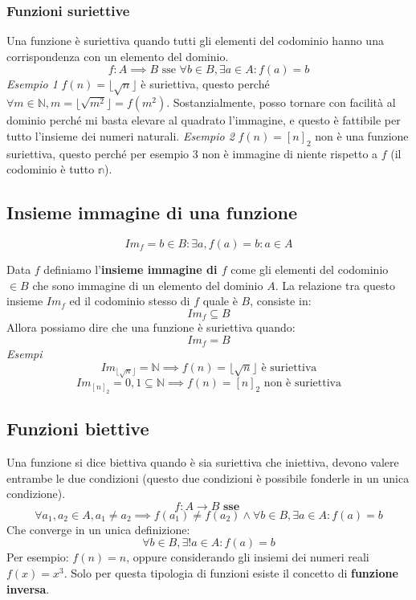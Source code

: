 \documentclass{article}
\begin{document}
\subsubsection{Funzioni suriettive}
Una funzione è suriettiva quando tutti gli elementi del codominio hanno una corrispondenza con un elemento del dominio.
$$f:A\implies B\text{ sse } \forall b\in B, \exists a \in A : f(a)=b$$
\noindent
\textit{Esempio 1}
\newline
$f(n)=\lfloor\sqrt{n}\rfloor$ è suriettiva, questo perché $\forall m\in \mathbb{N}, m=\lfloor\sqrt{m^2}\rfloor=f(m^2)$. Sostanzialmente, posso tornare con facilità al dominio perché mi basta elevare al quadrato l'immagine, e questo è fattibile per tutto l'insieme dei numeri naturali.
\noindent
\newline
\linebreak
\textit{Esempio 2}
\newline
$f(n)=[n]_2$ non è una funzione suriettiva, questo perché per esempio $3$ non è immagine di niente rispetto a $f$ (il codominio è tutto $\mathbb{n}$).

\subsection{Insieme immagine di una funzione}
$$Im_f={b\in B:\exists a,f(a)=b}:a\in A$$

Data $f$ definiamo l'\textbf{insieme immagine di $f$} come gli elementi del codominio $\in B$ che sono immagine di un elemento del dominio $A$.
\newline
La relazione tra questo insieme $Im_f$ ed il codominio stesso di $f$ quale è $B$, consiste in:
$$Im_f\subseteq B$$
Allora possiamo dire che una funzione è suriettiva quando:
$$Im_f=B$$
\newline
\textit{Esempi}
$$Im_{\lfloor\sqrt{n}\rfloor}=\mathbb{N}\implies f(n)=\lfloor\sqrt{n}\rfloor \text{ è suriettiva}$$
$$Im_{[n]_2}={0,1}\subseteq \mathbb{N} \implies f(n)=[n]_2 \text{ non è suriettiva}$$

\subsection{Funzioni biettive}
Una funzione si dice biettiva quando è sia suriettiva che iniettiva, devono valere entrambe le due condizioni (questo due condizioni è possibile fonderle in un unica condizione).
$$f:A\rightarrow B \textbf{ sse }$$
$$\forall a_1,a_2 \in A, a_1\neq a_2 \implies f(a_1)\neq f(a_2) \land \forall b\in B, \exists a\in A:f(a)=b$$
Che converge in un unica definizione:
$$\forall b \in B,\exists !a\in A : f(a)=b$$
Per esempio: $f(n)=n$, oppure considerando gli insiemi dei numeri reali $f(x)=x^3$. Solo per questa tipologia di funzioni esiste il concetto di \textbf{funzione inversa}.
\end{document}
